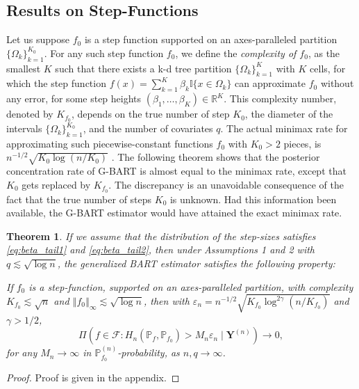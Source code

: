 \documentclass[12pt]{article}
\newcommand{\bm}[1]{\boldsymbol{#1}}
\renewcommand{\P}{\mathbb{P}}
\newcommand{\Y}{\bm{Y}}
\newcommand{\norm}[1]{\left\Vert#1\right\Vert}
\newcommand{\1}{\mathbb{I}}
\def\Y{\bm{Y}}
\renewcommand{\P}{\mathbb{P}}
\renewcommand{\Y}{\bm{Y}}
\theoremstyle{plain}
\newtheorem{theorem}{Theorem}[section]
\theoremstyle{definition}
\theoremstyle{remark}
\begin{document}
\subsection{Results on Step-Functions}\label{sub: step_result}
Let us suppose $f_0$ is a step function supported on an axes-paralleled partition $\{\Omega_k\}_{k=1}^{K_0}$. For any such step function $f_0$, we define the {\it complexity of $f_0$}, as the smallest $K$ such that there exists a k-d tree partition $\{\Omega_k\}_{k=1}^{K}$ with $K$ cells, for which the step function $f(x) = \sum_{k=1}^K \beta_k \mathbb{I}\{x \in \Omega_k\}$ can approximate $f_0$ without any error, for some step heights $(\beta_1, \dots, \beta_K) \in \mathbb{R}^K$. This complexity number, denoted by $K_{f_0}$, depends on the true number of step $K_0$, the diameter of the intervals $\{\Omega_k\}_{k=1}^{K_0}$, and the number of covariates $q$. The actual minimax rate for approximating such piecewise-constant functions $f_0$ with $K_0 > 2$ pieces, is $n^{-1/2}\sqrt{K_0 \log {(n/K_0)}}$ \citep{gao2017minimax}. The following theorem shows that the posterior concentration rate of G-BART is almost equal to the minimax rate, except that $K_0$ gets replaced by $K_{f_0}$. The discrepancy is an unavoidable consequence of the fact that the true number of steps $K_0$ is unknown. Had this information been available, the G-BART estimator would have attained the exact minimax rate.

\begin{theorem}\label{theorem: step}
If we assume that the distribution of the step-sizes satisfies \eqref{eq:beta_tail1} and \eqref{eq:beta_tail2}, then under Assumptions 1 and 2 with $q \lesssim \sqrt{\log n}$, the generalized BART estimator satisfies the following property:

If $f_0$ is a step-function, supported on an axes-paralleled partition, with complexity $K_{f_0} \lesssim \sqrt{n}$ and $\norm{f_0}_\infty \lesssim \sqrt{\log n}$, then with $\varepsilon_n=n^{-1/2}\sqrt{K_{f_0} \log^{2\gamma}{\left(n/K_{f_0}\right)}}$ and $\gamma > 1/2$,
\begin{equation*}
\Pi\left( f \in \mathcal{F}: H_n(\P_f,\P_{f_0}) > M_n \varepsilon_n \mid \Y^{(n)}\right) \to 0,
\end{equation*}
for any $M_n \rightarrow \infty$ in $\P_{f_0}^{(n)}$-probability, as $n,q \to \infty$. 
\end{theorem}
\vspace{-10pt}
\begin{proof}
Proof is given in the appendix.
\end{proof}
\end{document}
